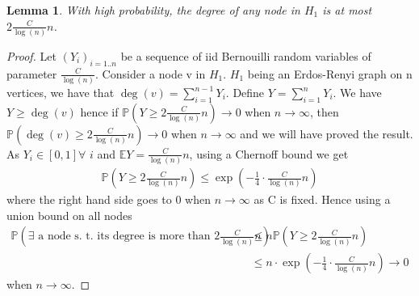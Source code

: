 \documentclass[english]{article}
\newtheorem{lemma}{Lemma}
\newcommand{\1}{\textbf{1}}
\newcommand{\E}{\mathbb{E}}
\newcommand{\p}{\mathbb{P}}
\begin{document}
\begin{lemma} \label{prop:degH1}
With high probability, the degree of any node in $H_1$ is at most $2 \frac{C}{\log(n)}n$.
\end{lemma}
\begin{proof}
Let $(Y_i)_{i=1..n}$ be a sequence of iid Bernouilli random variables of parameter $\frac{C}{\log(n)}$. Consider a node v in $H_1$. $H_1$ being an Erdos-Renyi graph on n vertices, we have that $\deg(v)= \sum_{i=1}^{n-1} Y_i$. Define $Y=\sum_{i=1}^n Y_i$. We have $Y \geq \deg(v)$ hence if $\p\left( Y \geq 2 \frac{C}{\log(n)}n \right) \rightarrow 0$ when $n \rightarrow \infty$, then $\p(\deg(v) \geq 2 \frac{C}{\log(n)}n) \rightarrow 0$ when $n \rightarrow \infty$ and we will have proved the result.\\

As $Y_i \in [0,1] \forall$ $i$ and $\E Y=\frac{C}{\log(n)}n$, using a Chernoff bound we get
\begin{align}
\p \left( Y \geq 2 \frac{C}{\log(n)}n \right) \leq \exp \left( - \frac{1}{4} \cdot \frac{C}{\log(n)}n \right)
\end{align}
where the right hand side goes to 0 when $n \rightarrow \infty$ as C is fixed. Hence using a union bound on all nodes
\begin{align}
\p\left( \exists \text{ a node s. t. its degree is more than } 2\frac{C}{\log(n)}n\right) &\leq n \p \left( Y \geq 2 \frac{C}{\log(n)}n \right) \\
&\leq n \cdot  \exp \left( - \frac{1}{4} \cdot \frac{C}{\log(n)}n \right) \rightarrow 0
\end{align}
when $n \rightarrow \infty$. 
\end{proof}
\end{document}
